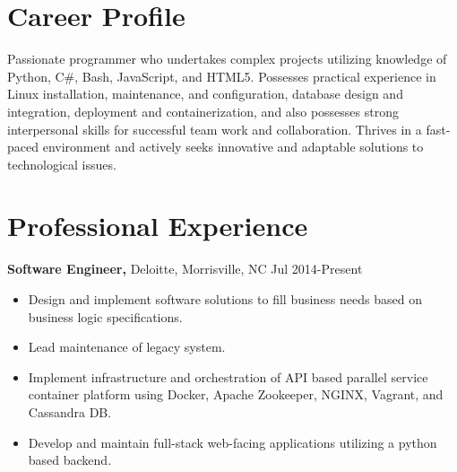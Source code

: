 \documentclass{res}
\begin{document}
 
 
\address{{\bf Present Address} \\ 10110 Strome Ave. Apt 107 \\ Raleigh, NC 27617  \\
        (336) 681-7224 }
\address{{\bf Permanent Address} \\ 114 East Keeling Rd \\ Greensborbo, NC 27410 \\
        (336) 299-7703 }
 
\begin{resume} 

\noindent\makebox[5in]{\rule{6in}{0.4pt}}


\section{Career Profile} 
Passionate programmer who undertakes complex projects utilizing knowledge of Python, C\#, Bash, JavaScript, and HTML5. Possesses practical experience in Linux installation, maintenance, and configuration, database design and integration, deployment and containerization, and also possesses strong interpersonal skills for successful team work and collaboration. Thrives in a fast-paced environment and actively seeks innovative and adaptable solutions to technological issues.

\section{Professional Experience}
  {\bf Software Engineer,} Deloitte, Morrisville, NC \hfill Jul 2014-Present
    \begin{itemize} \itemsep -2pt
     \item Design and implement software solutions to fill business needs based on business logic specifications.
     \item Lead maintenance of legacy system.
     \item Implement infrastructure and orchestration of API based parallel service container platform using Docker, Apache Zookeeper, NGINX, Vagrant, and Cassandra DB.
     \item Develop and maintain full-stack web-facing applications utilizing a python based backend.
     \end{itemize}
  

\end{resume}
\end{document}
